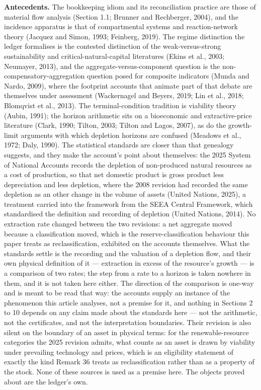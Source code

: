 \documentclass[11pt]{article}
\begin{document}
\textbf{Antecedents.} The bookkeeping idiom and its reconciliation practice are those of material flow analysis (Section 1.1; Brunner and Rechberger, 2004), and the incidence apparatus is that of compartmental systems and reaction-network theory (Jacquez and Simon, 1993; Feinberg, 2019). The regime distinction the ledger formalises is the contested distinction of the weak-versus-strong sustainability and critical-natural-capital literatures (Ekins et al., 2003; Neumayer, 2013), and the aggregate-versus-component question is the non-compensatory-aggregation question posed for composite indicators (Munda and Nardo, 2009), where the footprint accounts that animate part of that debate are themselves under assessment (Wackernagel and Beyers, 2019; Lin et al., 2018; Blomqvist et al., 2013). The terminal-condition tradition is viability theory (Aubin, 1991); the horizon arithmetic sits on a bioeconomic and extractive-price literature (Clark, 1990; Tilton, 2003; Tilton and Lagos, 2007), as do the growth-limit arguments with which depletion horizons are confused (Meadows et al., 1972; Daly, 1990). The statistical standards are closer than that genealogy suggests, and they make the account's point about themselves: the 2025 System of National Accounts records the depletion of non-produced natural resources as a cost of production, so that net domestic product is gross product less depreciation and less depletion, where the 2008 revision had recorded the same depletion as an other change in the volume of assets (United Nations, 2025), a treatment carried into the framework from the SEEA Central Framework, which standardised the definition and recording of depletion (United Nations, 2014). No extraction rate changed between the two revisions: a net aggregate moved because a classification moved, which is the reserve-classification behaviour this paper treats as reclassification, exhibited on the accounts themselves. What the standards settle is the recording and the valuation of a depletion flow, and their own physical definition of it --- extraction in excess of the resource's growth --- is a comparison of two rates; the step from a rate to a horizon is taken nowhere in them, and it is not taken here either. The direction of the comparison is one-way and is meant to be read that way: the accounts supply an instance of the phenomenon this article analyses, not a premise for it, and nothing in Sections 2 to 10 depends on any claim made about the standards here --- not the arithmetic, not the certificates, and not the interpretation boundaries. Their revision is also silent on the boundary of an asset in physical terms: for the renewable-resource categories the 2025 revision admits, what counts as an asset is drawn by viability under prevailing technology and prices, which is an eligibility statement of exactly the kind Remark 36 treats as reclassification rather than as a property of the stock. None of these sources is used as a premise here. The objects proved about are the ledger's own.
\end{document}
